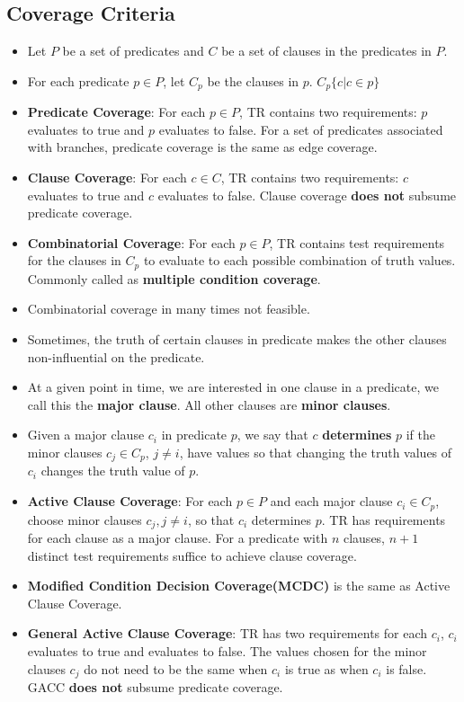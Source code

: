 \documentclass[a4paper]{article}
\begin{document}
\subsection{Coverage Criteria}
\begin{itemize}
    \item Let $P$ be a set of predicates and $C$ be a set of clauses in the predicates in $P$.
    \item For each predicate $p\in P$, let $C_p$ be the clauses in $p$. $C_p\{c|c\in p\}$
    \item \textbf{Predicate Coverage}: For each $p\in P$, TR contains two requirements: $p$ evaluates to true and $p$ evaluates to false. For a set of predicates associated with branches, predicate coverage is the same as edge coverage.
    \item \textbf{Clause Coverage}: For each $c\in C$, TR contains two requirements: $c$ evaluates to true and $c$ evaluates to false. Clause coverage \textbf{does not} subsume predicate coverage.
    \item \textbf{Combinatorial Coverage}: For each $p\in P$, TR contains test requirements for the clauses in $C_p$ to evaluate to each possible combination of truth values. Commonly called as \textbf{multiple condition coverage}.
    \item Combinatorial coverage in many times not feasible.
    \item Sometimes, the truth of certain clauses in predicate makes the other clauses non-influential on the predicate.
    \item At a given point in time, we are interested in one clause in a predicate, we call this the \textbf{major clause}. All other clauses are \textbf{minor clauses}.
    \item  Given a major clause $c_i$ in predicate $p$, we say that $c$ \textbf{determines} $p$ if the minor clauses $c_j\in C_p$, $j\neq i$, have values so that changing the truth values of $c_i$ changes the truth value of $p$. 
    \item \textbf{Active Clause Coverage}: For each $p\in P$ and each major clause $c_i\in C_p$, choose minor clauses $c_j, j\neq i$, so that $c_i$ determines $p$. TR has requirements for each clause as a major clause. For a predicate with $n$ clauses, $n+1$ distinct test requirements suffice to achieve clause coverage.
    \item \textbf{Modified Condition Decision Coverage(MCDC)} is the same as Active Clause Coverage.
    \item \textbf{General Active Clause Coverage}: TR has two requirements for each $c_i$, $c_i$ evaluates to true and evaluates to false. The values chosen for the minor clauses $c_j$ do not need to be the same when $c_i$ is true as when $c_i$ is false. GACC \textbf{does not} subsume predicate coverage.

\end{itemize}
\end{document}
